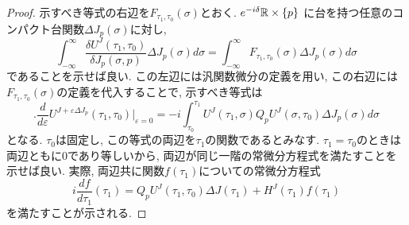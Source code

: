 \begin{proof}
  示すべき等式の右辺を$F_{\tau_1, \tau_0}(\sigma)$とおく.
  $e^{-i\delta}\mathbb{R} \times \{p\}$
  に台を持つ任意のコンパクト台関数$\Delta J_p (\sigma)$に対し,
  \begin{equation}
    \int_{-\infty}^{\infty} \frac{\delta U^J(\tau_1, \tau_0)}{\delta J_p(\sigma,p)} \Delta J_p(\sigma) d\sigma =
    \int_{-\infty}^{\infty} F_{\tau_1, \tau_0}(\sigma) \Delta J_p(\sigma) d\sigma
  \end{equation}
  であることを示せば良い.
  この左辺には汎関数微分の定義を用い, この右辺には$F_{\tau_1, \tau_0}(\sigma)$の定義を代入することで, 示すべき等式は
  \begin{equation}
    \biggl.\frac{d}{d\varepsilon}U^{J+\varepsilon\Delta J_p}(\tau_1,\tau_0)\biggr|_{\varepsilon=0} =
    -i\int_{\tau_0}^{\tau_1}U^J(\tau_1,\sigma)Q_pU^J(\sigma,\tau_0)\Delta J_p(\sigma)d\sigma
  \end{equation}
  となる.
  $\tau_0$は固定し, この等式の両辺を$\tau_1$の関数であるとみなす.
  $\tau_1 = \tau_0$のときは両辺ともに$0$であり等しいから, 両辺が同じ一階の常微分方程式を満たすことを示せば良い.
  実際, 両辺共に関数$f(\tau_1)$についての常微分方程式
  \begin{equation}
    i\frac{df}{d\tau_1}(\tau_1) = Q_pU^J(\tau_1,\tau_0)\Delta J(\tau_1)
     + H^J(\tau_1)f(\tau_1)
  \end{equation}
  を満たすことが示される.


\end{proof}
